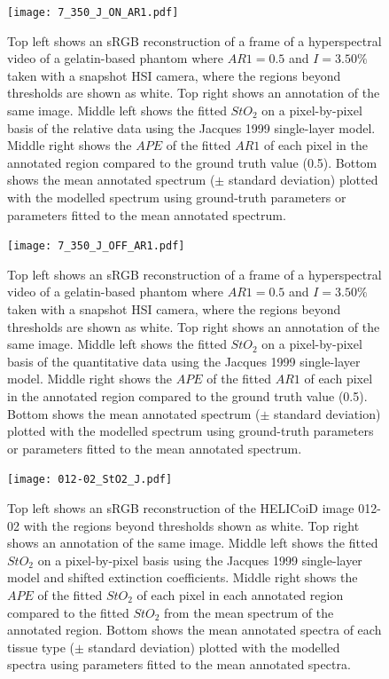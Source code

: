 \begin{subappendices}
\begin{figure}[h!]
    \centering 
    \texttt{[image: 7\_350\_J\_ON\_AR1.pdf]}
    \caption{Top left shows an sRGB reconstruction of a frame of a hyperspectral video of a gelatin-based phantom where $AR1=0.5$ and $I=3.50\%$ taken with a snapshot HSI camera, where the regions beyond thresholds are shown as white. Top right shows an annotation of the same image. Middle left shows the fitted $StO_2$ on a pixel-by-pixel basis of the relative data using the Jacques 1999 single-layer model. Middle right shows the $APE$ of the fitted $AR1$ of each pixel in the annotated region compared to the ground truth value (0.5). Bottom shows the mean annotated spectrum ($\pm$ standard deviation) plotted with the modelled spectrum using ground-truth parameters or parameters fitted to the mean annotated spectrum.}
    \label{ap:gelatinpbpegRJ}
\end{figure}

\begin{figure}[h!]
    \centering 
    \texttt{[image: 7\_350\_J\_OFF\_AR1.pdf]}
    \caption{Top left shows an sRGB reconstruction of a frame of a hyperspectral video of a gelatin-based phantom where $AR1=0.5$ and $I=3.50\%$ taken with a snapshot HSI camera, where the regions beyond thresholds are shown as white. Top right shows an annotation of the same image. Middle left shows the fitted $StO_2$ on a pixel-by-pixel basis of the quantitative data using the Jacques 1999 single-layer model. Middle right shows the $APE$ of the fitted $AR1$ of each pixel in the annotated region compared to the ground truth value (0.5). Bottom shows the mean annotated spectrum ($\pm$ standard deviation) plotted with the modelled spectrum using ground-truth parameters or parameters fitted to the mean annotated spectrum.}
    \label{ap:gelatinpbpegQJ}
\end{figure}

\begin{figure}[h!]
    \centering 
    \texttt{[image: 012-02\_StO2\_J.pdf]}
    \caption{Top left shows an sRGB reconstruction of the HELICoiD image 012-02 with the regions beyond thresholds shown as white. Top right shows an annotation of the same image. Middle left shows the fitted $StO_2$ on a pixel-by-pixel basis using the Jacques 1999 single-layer model and shifted extinction coefficients. Middle right shows the $APE$ of the fitted $StO_2$ of each pixel in each annotated region compared to the fitted $StO_2$ from the mean spectrum of the annotated region. Bottom shows the mean annotated spectra of each tissue type ($\pm$ standard deviation) plotted with the modelled spectra using parameters fitted to the mean annotated spectra.}
    \label{ap:HELICoiDpixelJ}
\end{figure}
\FloatBarrier


\end{subappendices}
